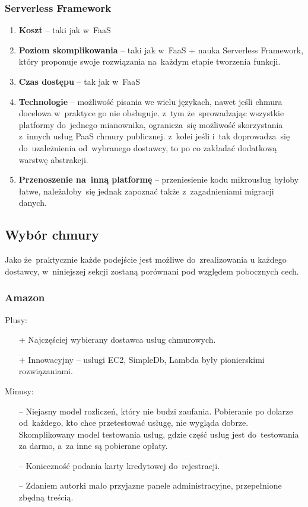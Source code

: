 \documentclass[12pt,a4paper,twoside,titlepage,openright]{book}
\begin{document}
\subsubsection{Serverless Framework}

\begin{enumerate}
	\item \textbf{Koszt} -- taki jak w~FaaS
	\item \textbf{Poziom skomplikowania} -- taki jak w~FaaS + nauka Serverless Framework, który proponuje swoje rozwiązania na~każdym etapie tworzenia funkcji. 
	\item \textbf{Czas dostępu} -- tak jak w~FaaS
	\item \textbf{Technologie} -- możliwość pisania we wielu językach, nawet jeśli chmura docelowa w~praktyce go nie obsługuje. z~tym że~sprowadzając wszystkie platformy do~jednego mianownika, ogranicza~się możliwość skorzystania z~innych usług PaaS chmury publicznej. z~kolei jeśli i~tak doprowadza~się do~uzależnienia od~wybranego dostawcy, to po co zakładać dodatkową warstwę abstrakcji.
	\item \textbf{Przenoszenie na~inną platformę} -- przeniesienie kodu mikrousług byłoby łatwe, należałoby~się jednak zapoznać także z~zagadnieniami migracji danych.
\end{enumerate}
	
\subsection{Wybór chmury}

Jako że~praktycznie każde podejście jest możliwe do~zrealizowania u każdego dostawcy, w~niniejszej sekcji zostaną porównani pod względem pobocznych cech.

\subsubsection{Amazon}

Plusy:
\begin{itemize}
\item[+] Najczęściej wybierany dostawca usług chmurowych.
\item[+] Innowacyjny -- usługi EC2, SimpleDb, Lambda były pionierskimi rozwiązaniami.
\end{itemize}

\noindent
Minusy:
\begin{itemize}
\item[--] Niejasny model rozliczeń, który nie budzi zaufania. Pobieranie po dolarze od~każdego, kto chce przetestować usługę, nie wygląda dobrze. Skomplikowany model testowania usług, gdzie część usług jest do~testowania za darmo, a~za inne są pobierane opłaty. 
\item[--] Konieczność podania karty kredytowej do~rejestracji.
\item[--] Zdaniem autorki mało przyjazne panele administracyjne, przepełnione zbędną treścią.
\end{itemize}
\end{document}
